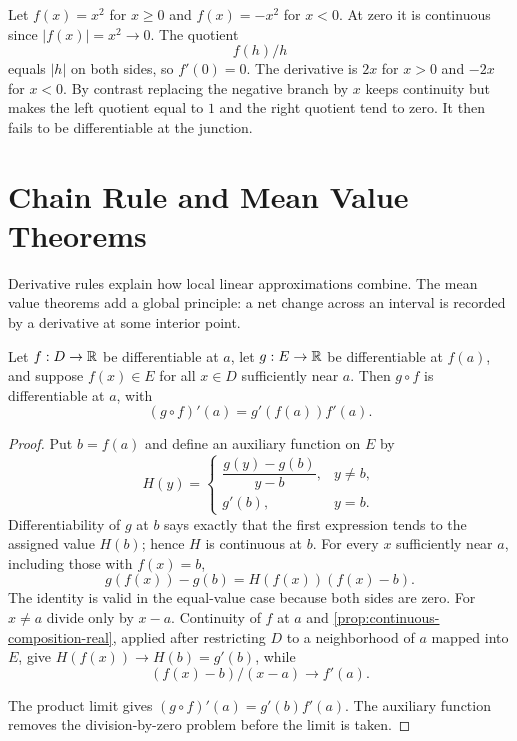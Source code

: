 \begin{example}
Let $f(x)=x^2$ for $x\geq0$ and $f(x)=-x^2$ for $x<0$.
At zero it is continuous since $|f(x)|=x^2\to0$.
The quotient
\[
f(h)/h
\]
 equals $|h|$ on both sides, so $f'(0)=0$.
The derivative is $2x$ for $x>0$ and $-2x$ for $x<0$.
By contrast replacing the negative branch by $x$ keeps continuity
but makes the left quotient equal to $1$ and the right quotient
tend to zero. It then fails to be differentiable at the junction.
\end{example}

\section{Chain Rule and Mean Value Theorems}

Derivative rules explain how local linear approximations combine.  The mean
value theorems add a global principle: a net change across an interval is
recorded by a derivative at some interior point.

\begin{theorem}
\label{thm:chain-rule}
Let $f:D\to\mathbb{R}$ be differentiable at $a$, let $g:E\to\mathbb{R}$ be differentiable at $f(a)$, and suppose $f(x)\in E$ for all $x\in D$ sufficiently near $a$. Then $g\circ f$ is differentiable at $a$, with
\[
(g\circ f)'(a)=g'(f(a))f'(a).
\]
\end{theorem}
\begin{proof}
Put $b=f(a)$ and define an auxiliary function on $E$ by
\[
H(y)=\begin{cases}
\dfrac{g(y)-g(b)}{y-b},&y\ne b,\\
g'(b),&y=b.
\end{cases}
\]
Differentiability of $g$ at $b$ says exactly that the first expression
tends to the assigned value $H(b)$; hence $H$ is continuous at $b$.
For every $x$ sufficiently near $a$, including those with $f(x)=b$,
\[
g(f(x))-g(b)=H(f(x))(f(x)-b).
\]
The identity is valid in the equal-value case because both sides are zero.
For $x\ne a$ divide only by $x-a$. Continuity of $f$ at $a$ and
\cref{prop:continuous-composition-real}, applied after restricting $D$
to a neighborhood of $a$ mapped into $E$, give
$H(f(x))\to H(b)=g'(b)$, while
\[
(f(x)-b)/(x-a)\to f'(a).
\]

The product limit gives $(g\circ f)'(a)=g'(b)f'(a)$. The auxiliary function
removes the division-by-zero problem before the limit is taken.
\end{proof}

